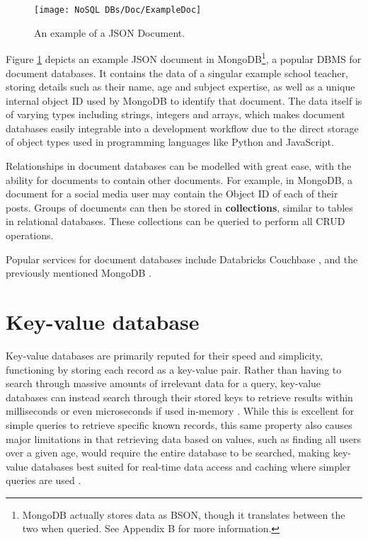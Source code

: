 
\begin{figure}[H]
    \centering  
    \texttt{[image: NoSQL DBs/Doc/ExampleDoc]}
    \caption{An example of a JSON Document.\label{fig:ExampleDoc}}
\end{figure}

\noindent Figure \ref{fig:ExampleDoc} depicts an example JSON document in MongoDB\footnote{MongoDB actually stores data as BSON, though it translates between the two when queried. See Appendix B for more information.}, a popular DBMS
for document databases. It contains the data of a singular example school teacher, storing details such as their name, age and subject expertise, as well as a unique internal object ID used by MongoDB to identify that document. The data itself is of varying types including 
strings, integers and arrays, which makes document databases easily integrable into a development workflow due to the direct 
storage of object types used in programming languages like Python and JavaScript.

\para Relationships in document databases can be modelled with great ease, with the ability for documents to contain other documents. 
For example, in MongoDB, a document for a social media user may contain the Object ID of each of their posts. Groups of documents can then
be stored in \textbf{collections}, similar to tables in relational databases. These collections can be queried to perform all CRUD operations. 


\para Popular services for document databases include Databricks \autocite{databricksDataAICompany2023} Couchbase \autocite{couchbaseCouchbaseBestFree}, and the previously mentioned MongoDB \autocite{mongodbDocumentDatabaseNoSQL}.


\section{Key-value database}
Key-value databases are primarily reputed for their speed and simplicity, functioning by storing each record as a key-value pair.
Rather than having to search through massive amounts of irrelevant data for a query, key-value databases can instead search 
through their stored keys to retrieve results within milliseconds or even microseconds if used in-memory \autocite{redisRedisFAQ}.
While this is excellent for simple queries to retrieve specific known records, this same property also causes major limitations in
that retrieving data based on values, such as finding all users over a given age, would require the entire database to be searched,
making key-value databases best suited for real-time data access and caching where simpler queries are used \autocite{mongodbWhatKeyValueDatabase}.

